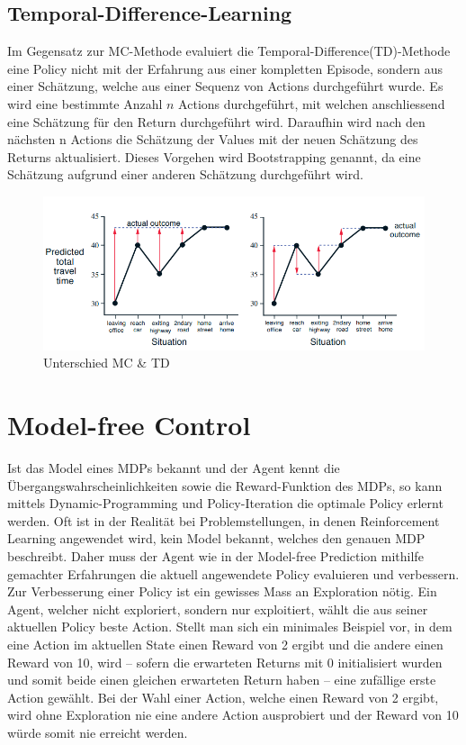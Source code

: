 \subsection{Temporal-Difference-Learning}
Im Gegensatz zur MC-Methode evaluiert die Temporal-Difference(TD)-Methode eine Policy nicht mit der Erfahrung aus einer kompletten Episode, sondern aus einer Schätzung, welche aus einer Sequenz von Actions durchgeführt wurde. Es wird eine bestimmte Anzahl $n$ Actions durchgeführt, mit welchen anschliessend eine Schätzung für den Return durchgeführt wird. Daraufhin wird nach den nächsten n Actions die Schätzung der Values mit der neuen Schätzung des Returns aktualisiert. Dieses Vorgehen wird Bootstrapping genannt, da eine Schätzung aufgrund einer anderen Schätzung durchgeführt wird.

 \begin{figure}[ht]
  \centering
  \includegraphics[width=\textwidth]{img/diff_mc_td.png}
  \caption{Unterschied MC \& TD \cite{td-mc}}
      \label{fig:diff-mc-td}
\end{figure} 


\newpage
\section{Model-free Control}
Ist das Model eines MDPs bekannt und der Agent kennt die Übergangswahrscheinlichkeiten sowie die Reward-Funktion des MDPs, so kann mittels Dynamic-Programming und Policy-Iteration die optimale Policy erlernt werden. Oft ist in der Realität bei Problemstellungen, in denen Reinforcement Learning angewendet wird, kein Model bekannt, welches den genauen MDP beschreibt. Daher muss der Agent wie in der Model-free Prediction mithilfe gemachter Erfahrungen die aktuell angewendete Policy evaluieren und verbessern. Zur Verbesserung einer Policy ist ein gewisses Mass an Exploration nötig. Ein Agent, welcher nicht exploriert, sondern nur exploitiert, wählt die aus seiner aktuellen Policy beste Action. Stellt man sich ein minimales Beispiel vor, in dem eine Action im aktuellen State einen Reward von 2 ergibt und die andere einen Reward von 10, wird – sofern die erwarteten Returns mit 0 initialisiert wurden und somit beide einen gleichen erwarteten Return haben – eine zufällige erste Action gewählt. Bei der Wahl einer Action, welche einen Reward von 2 ergibt, wird ohne Exploration nie eine andere Action ausprobiert und der Reward von 10 würde somit nie erreicht werden. 
